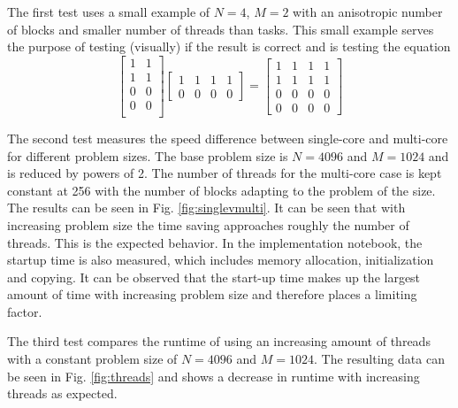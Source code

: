 \documentclass{article}
\begin{document}
The first test uses a small example of $N=4$, $M=2$ with an anisotropic number of blocks and smaller number of threads than tasks. This small example serves the purpose of testing (visually) if the result is correct and is testing the equation
\begin{equation}
    \begin{bmatrix}
        1&1\\
        1&1\\
        0&0\\
        0&0\\
    \end{bmatrix}
    \begin{bmatrix}
        1&1&1&1\\
        0&0&0&0
    \end{bmatrix}
    = \begin{bmatrix}
        1&1&1&1\\
        1&1&1&1\\
        0&0&0&0\\
        0&0&0&0
    \end{bmatrix}
\end{equation}

The second test measures the speed difference between single-core and multi-core for different problem sizes. The base problem size is $N = 4096$ and $M = 1024$ and is reduced by powers of 2. The number of threads for the multi-core case is kept constant at 256 with the number of blocks adapting to the problem of the size. The results can be seen in Fig. \ref{fig:singlevmulti}. It can be seen that with increasing problem size the time saving approaches roughly the number of threads. This is the expected behavior. In the implementation notebook, the startup time is also measured, which includes memory allocation, initialization and copying. It can be observed that the start-up time makes up the largest amount of time with increasing problem size and therefore places a limiting factor. 

The third test compares the runtime of using an increasing amount of threads with a constant problem size of $N = 4096$ and $M = 1024$. The resulting data can be seen in Fig. \ref{fig:threads} and shows a decrease in runtime with increasing threads as expected.
\end{document}
